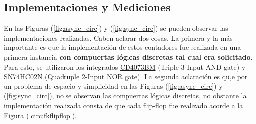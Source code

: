 \subsection{Implementaciones y Mediciones}
En las Figuras (\ref{fig:async_circ}) y (\ref{fig:sync_circ}) se pueden observar las implementaciones realizadas. Caben aclarar dos cosas. La primera y la más importante es que la implementación de estos contadores fue realizada en una primera instancia \textbf{con compuertas lógicas discretas tal cual era solicitado}. Para esto, se utilizaron los integrados \href{https://www.ti.com/lit/ds/symlink/cd4073b.pdf}{CD4073BM} (Triple 3-Input AND gate) y \href{http://www.ti.com/lit/ds/symlink/sn74hc02.pdf}{SN74HC02N} (Quadruple 2-Input NOR gate). La segunda aclaración es qu,e por un problema de espacio y simplicidad en las Figuras (\ref{fig:async_circ}) y (\ref{fig:sync_circ}), no se observan las compuertas lógicas discretas, no obstante la implementación realizada consta de que cada flip-flop fue realizado acorde a la Figura (\ref{circ:fkflipflop}).


